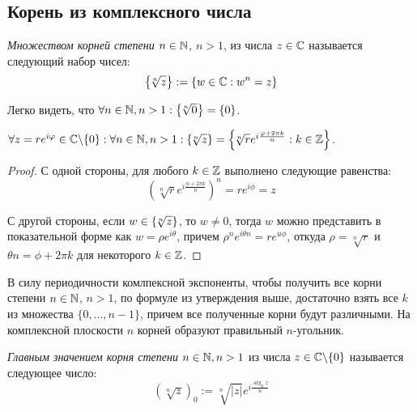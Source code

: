 \subsection{Корень из комплексного числа}

\begin{definition}
	\textit{Множеством корней степени $n \in \mathbb{N}$, $n > 1$}, из числа $z \in \mathbb{C}$ называется следующий набор чисел:
	\[\left\{\!\sqrt[n]{z}\right\} := \left\{w \in \mathbb{C}: w^n = z\right\}\]
\end{definition}

\begin{note}
	Легко видеть, что $\forall n \in \mathbb{N}, n > 1: \left\{\!\sqrt[n]{0}\right\} = \{0\}$.
\end{note}

\begin{proposition}
	$\forall z = re^{i\varphi} \in \mathbb{C} \backslash \{0\}: \forall n \in \mathbb{N}, n > 1: \left\{\!\sqrt[n]{z}\right\} = \left\{\!\sqrt[n]{r}e^{i\frac{\varphi + 2\pi k}{n}} : k \in \mathbb{Z}\right\}$.
\end{proposition}

\begin{proof}
	С одной стороны, для любого $k \in \mathbb{Z}$ выполнено следующие равенства:
	\[\left(\!\sqrt[n]{r}e^{i\frac{\phi + 2\pi k}{n}}\right)^n = re^{i\phi} = z\]
	
	С другой стороны, если $w \in \left\{\!\sqrt[n]{z}\right\}$, то $w \ne 0$, тогда $w$ можно представить в показательной форме как $w = \rho e^{i\theta}$, причем $\rho^ne^{i\theta n} = re^{u\phi}$, откуда $\rho = \sqrt[n]{r}$ и $\theta n = \phi + 2\pi k$ для некоторого $k \in \mathbb{Z}$.
\end{proof}

\begin{note}
	В силу периодичности комлпексной экспоненты, чтобы получить все корни степени $n \in \mathbb{N}$, $n > 1$, по формуле из утверждения выше, достаточно взять все $k$ из множества $\{0, \dotsc, n - 1\}$, причем все полученные корни будут различными. На комплексной плоскости $n$ корней образуют правильный $n$-угольник.
\end{note}

\begin{definition}
	\textit{Главным значением корня степени $n \in \mathbb{N}, n > 1$} из числа $z \in \mathbb{C} \backslash \{0\}$ называется следующее число:
	\[\left(\!\sqrt[n]{z}\right)_0 := \sqrt[n]{|z|}e^{i\frac{\arg_0z}n}\]
\end{definition}